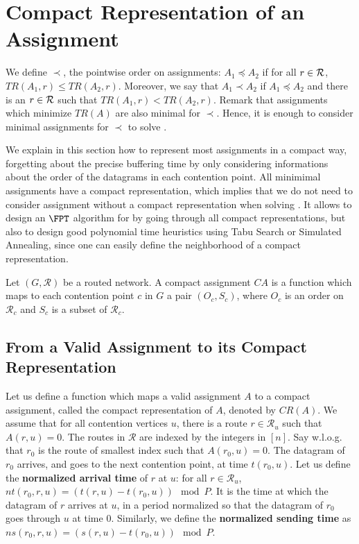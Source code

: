 \section{Compact Representation of an Assignment}

 We define $\prec$, the pointwise order on assignments: $A_1 \preceq A_2$ if for all $r\in {\cal R}$, $TR(A_1,r) \leq TR(A_2,r)$. Moreover, we say that $A_1 \prec A_2$ if $A_1 \preceq A_2$ and there is an $r \in \cal {R}$ such that  $TR(A_1,r) < TR(A_2,r)$. Remark that assignments which minimize $TR(A)$ are also minimal for $\prec$. Hence, it is enough to consider minimal assignments for $\prec$ to solve \spall.

We explain in this section how to represent most assignments in a compact way, forgetting about the precise buffering time by only considering informations about the order of the datagrams in each contention point. All minimimal assignments have a compact representation, which implies that we do not need to consider assignment without a compact representation when solving \spall. 
It allows to design an $\FPT$ algorithm for \spall by going through all compact representations, but also to design good polynomial time heuristics using Tabu Search or Simulated Annealing, since one can easily define the neighborhood of a compact representation.


\begin{definition}
Let $(G, \mathcal{R})$ be a routed network. A compact assignment $CA$ is a function which maps to each contention point $c$ in $G$ a pair $(O_c,S_c)$, where $O_c$ is an order on $\mathcal{R}_c$ and $S_c$ is a subset of $\mathcal{R}_c$.
\label{definition:compact}
\end{definition}


\subsection{From a Valid Assignment to its Compact Representation}

Let us define a function which maps a valid assignment $A$ to a compact assignment, called the compact representation of $A$, denoted by $CR(A)$. We assume that for all contention vertices $u$, there is a route $r \in \mathcal{R}_u$ such that $A(r,u) = 0$. The routes in $\mathcal{R}$ are indexed by the integers in $[n]$. Say w.l.o.g. that $r_0$ is the route of smallest index such that $A(r_0,u) = 0$. The datagram of $r_0$ arrives, and goes to the next contention point, at time $t(r_0,u)$. Let us define the \textbf{normalized arrival time} of $r$ at $u$: for all $r \in \mathcal{R}_u$, $nt(r_0,r,u) = (t(r,u) - t(r_0,u)) \mod P$. It is the time at which the datagram of $r$ arrives at $u$, in a period normalized so that the datagram of $r_0$ goes through $u$ at time $0$. Similarly, we define the \textbf{normalized sending time} as $ns(r_0,r,u) = (s(r,u) - t(r_0,u)) \mod P$.

